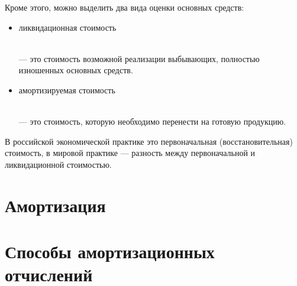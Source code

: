 Кроме этого, можно выделить два вида оценки основных средств:

\begin{itemize}
    \item ликвидационная стоимость
        \begin{definition}
            \normalfont
            ~\\
             --- это стоимость возможной
            реализации выбывающих, полностью изношенных основных средств.
        \end{definition}

    \item амортизируемая стоимость
        \begin{definition}
            \normalfont
            ~\\
             --- это стоимость, которую
            необходимо перенести на готовую продукцию.
        \end{definition}
\end{itemize}

В российской экономической практике это первоначальная
(восстановительная) стоимость, в мировой практике --- разность между
первоначальной и ликвидационной стоимостью.

\section{Амортизация}

\section{Способы амортизационных отчислений}
